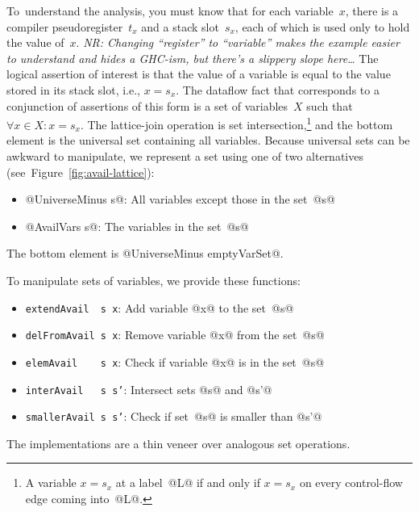 \documentclass[blockstyle,preprint,nocopyrightspace]{sigplanconf}
\newcommand\slotof[1]{\ensuremath{s_{#1}}}
\newcommand\tempof[1]{\ensuremath{t_{#1}}}
\newcommand{\authornote}[1]{{\em #1}}
\newcommand{\norman}[1]{\authornote{NR: #1}}
\let\remark\norman
\newcommand\figref[1]{Figure~\ref{fig:#1}}
\begin{document}
To~understand the analysis, you must know that for each variable~$x$,
there is a compiler pseudoregister~\tempof x and a stack slot~\slotof x, each of
which is used only to hold the value of~$x$.
\remark{Changing ``register'' to
``variable'' makes the example easier to understand and hides a
GHC-ism, but there's a slippery slope here\ldots}
%
The logical assertion of interest is that the value of a variable is
equal to the value stored in its stack slot, i.e., $x = \slotof x$.
The dataflow fact that corresponds to a conjunction of assertions of
this form is a set of variables~$X$ such that $\forall x \in X \mathrel
: x = \slotof x$.
The lattice-join operation is set intersection,\footnote
{A variable $x = \slotof x$ at a label~@L@ if and
only if $x = \slotof x$ on every control-flow edge coming into~@L@.}
and the bottom element
is the universal set containing all variables.
Because universal sets can be awkward to manipulate, we represent a
set using one of two alternatives
(see~\figref{avail-lattice}):
\begin{itemize}
\item @UniverseMinus s@: All variables except those in the set~@s@
\item @AvailVars s@: The variables in the set~@s@
\end{itemize}
The bottom element is @UniverseMinus emptyVarSet@.





To manipulate sets of variables, we provide these functions:
\begin{itemize}
\item \texttt{extendAvail~~s~x}: Add variable @x@ to the set~@s@
\item \texttt{delFromAvail~s~x}: Remove variable @x@ from the set~@s@
\item \texttt{elemAvail~~~~s~x}: Check if variable @x@ is in the set~@s@
\item \texttt{interAvail~~~s s'}: Intersect sets @s@ and @s'@
\item \texttt{smallerAvail~s s'}: Check if set~@s@ is smaller than @s'@
\end{itemize}
The implementations are a thin veneer over analogous set operations.
\end{document}
